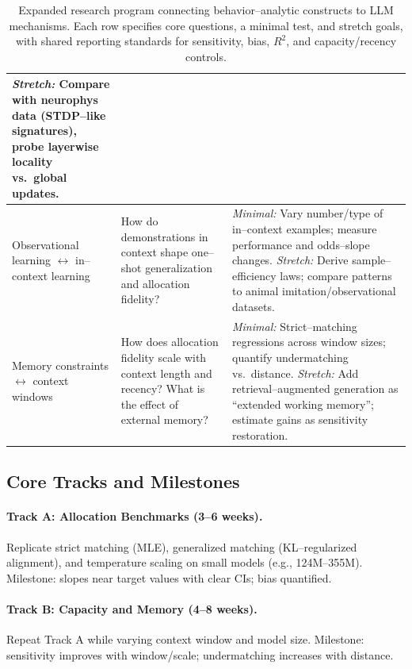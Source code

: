 \documentclass[11pt]{article}
\begin{document}
\begin{table}[h!]
\begin{tabular}{|p{}|p{}|p{}|}
\emph{Stretch:} Compare with neurophys data (STDP–like signatures), probe layerwise locality vs.\ global updates.\\
\hline
Observational learning $\leftrightarrow$ in–context learning &
How do demonstrations in context shape one–shot generalization and allocation fidelity? &
\emph{Minimal:} Vary number/type of in–context examples; measure performance and odds–slope changes. \newline
\emph{Stretch:} Derive sample–efficiency laws; compare patterns to animal imitation/observational datasets.\\
\hline
Memory constraints $\leftrightarrow$ context windows &
How does allocation fidelity scale with context length and recency? What is the effect of external memory? &
\emph{Minimal:} Strict–matching regressions across window sizes; quantify undermatching vs.\ distance. \newline
\emph{Stretch:} Add retrieval–augmented generation as “extended working memory”; estimate gains as sensitivity restoration.\\
\hline
\end{tabular}
\caption{Expanded research program connecting behavior–analytic constructs to LLM mechanisms. Each row specifies core questions, a minimal test, and stretch goals, with shared reporting standards for sensitivity, bias, $R^2$, and capacity/recency controls.}
\label{tab:program}
\end{table}

\subsection*{Core Tracks and Milestones}
\paragraph{Track A: Allocation Benchmarks (3–6 weeks).}
Replicate strict matching (MLE), generalized matching (KL–regularized alignment), and temperature scaling on small models (e.g., 124M–355M). Milestone: slopes near target values with clear CIs; bias quantified.

\paragraph{Track B: Capacity and Memory (4–8 weeks).}
Repeat Track A while varying context window and model size. Milestone: sensitivity improves with window/scale; undermatching increases with distance.
\end{document}

